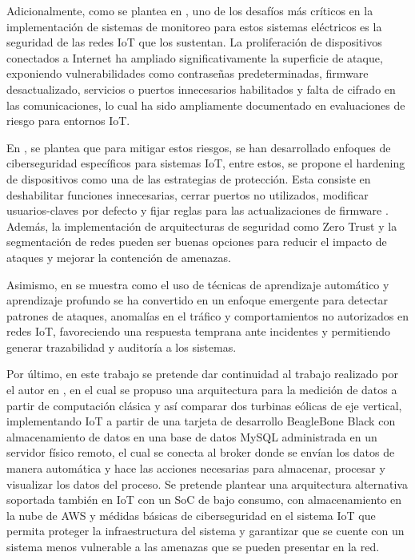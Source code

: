 \documentclass[letterpaper,12pt, oneside]{book}
\begin{document}
Adicionalmente, como se plantea en \cite{ref37}, uno de los desafíos más críticos en la implementación de sistemas de monitoreo para estos sistemas eléctricos es la seguridad de las redes IoT que los sustentan. La proliferación de dispositivos conectados a Internet ha ampliado significativamente la superficie de ataque, exponiendo vulnerabilidades como contraseñas predeterminadas, firmware desactualizado, servicios o puertos innecesarios habilitados y falta de cifrado en las comunicaciones, lo cual ha sido ampliamente documentado en evaluaciones de riesgo para entornos IoT. 

En \cite{ref40}, se plantea que para mitigar estos riesgos, se han desarrollado enfoques de ciberseguridad específicos para sistemas IoT, entre estos, se propone el hardening de dispositivos como una de las estrategias de protección. Esta consiste en deshabilitar funciones innecesarias, cerrar puertos no utilizados, modificar usuarios-claves por defecto y fijar reglas para las actualizaciones de firmware \cite{ref38} \cite{ref39}. Además, la implementación de arquitecturas de seguridad como Zero Trust y la segmentación de redes pueden ser buenas opciones para reducir el impacto de ataques y mejorar la contención de amenazas.

Asimismo, en \cite{ref41} se muestra como el uso de técnicas de aprendizaje automático y aprendizaje profundo se ha convertido en un enfoque emergente para detectar patrones de ataques, anomalías en el tráfico y comportamientos no autorizados en redes IoT, favoreciendo una respuesta temprana ante incidentes y permitiendo generar trazabilidad y auditoría a los sistemas. 

Por último, en este trabajo se pretende dar continuidad al trabajo realizado por el autor en \cite{ref12}, en el cual se propuso una arquitectura para la medición de datos a partir de computación clásica y así comparar dos turbinas eólicas de eje vertical, implementando IoT a partir de una tarjeta de desarrollo BeagleBone Black con almacenamiento de datos en una base de datos MySQL administrada en un servidor físico remoto, el cual se conecta al broker donde se envían los datos de manera automática y hace las acciones necesarias para almacenar, procesar y visualizar los datos del proceso. Se pretende plantear una arquitectura alternativa soportada también en IoT con un SoC de bajo consumo, con almacenamiento en la nube de AWS y médidas básicas de ciberseguridad en el sistema IoT que permita proteger la infraestructura del sistema y garantizar que se cuente con un sistema menos vulnerable a las amenazas que se pueden presentar en la red.
\end{document}
